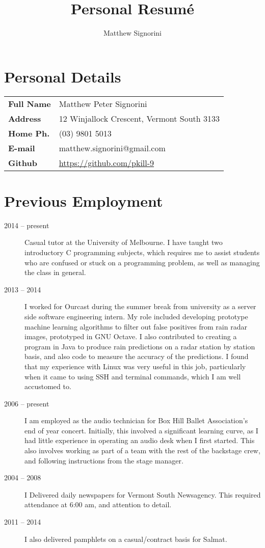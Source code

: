 \documentclass[a4paper]{article}
\title{Personal Resum\'e}
\author{Matthew Signorini}
\begin{document}
\maketitle

\section{Personal Details}
\begin{tabular}{>{\raggedright}m{3cm} l}
    \textbf{Full Name} &Matthew Peter Signorini\\
 \textbf{Address} &12 Winjallock Crescent, Vermont South 3133\\
\textbf{Home Ph.} &(03) 9801 5013\\
  \textbf{E-mail} &matthew.signorini@gmail.com\\
    \textbf{Github} &\url{https://github.com/pkill-9}
\end{tabular}


\section{Previous Employment}
\begin{description}
    \item[2014 -- present] Casual tutor at the University of Melbourne. I
        have taught two introductory C programming subjects, which requires
        me to assist students who are confused or stuck on a programming
        problem, as well as managing the class in general.
    \item[2013 -- 2014] I worked for Ourcast during the summer break from
        university as a server side software engineering intern. My role
        included developing prototype machine learning algorithms to filter
        out false positives from rain radar images, prototyped in GNU 
        Octave. I also contributed to creating a program in Java to produce
        rain predictions on a radar station by station basis, and also code
        to measure the accuracy of the predictions. I found that my
        experience with Linux was very useful in this job, particularly when
        it came to using SSH and terminal commands, which I am well accustomed
        to.
    \item[2006 -- present] I am employed as the audio technician for Box
        Hill Ballet Association's end of year concert. Initially, this 
        involved a significant learning curve, as I had little experience 
        in operating an audio desk when I first started. This also involves 
        working as part of a team with the rest of the backstage crew, and
        following instructions from the stage manager.
    \item[2004 -- 2008] I Delivered daily newspapers for Vermont South
        Newsagency. This required attendance at 6:00 am, and attention to
        detail.
    \item[2011 -- 2014] I also delivered pamphlets on a casual/contract
        basis for Salmat.
\end{description}
\end{document}
